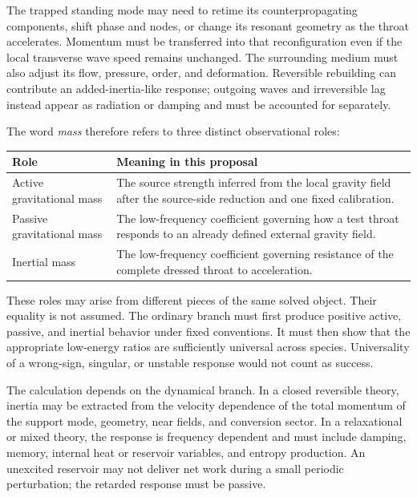 The trapped standing mode may need to retime its counterpropagating components,
shift phase and nodes, or change its resonant geometry as the throat accelerates.
Momentum must be transferred into that reconfiguration even if the local
transverse wave speed remains unchanged. The surrounding medium must also adjust
its flow, pressure, order, and deformation. Reversible rebuilding can contribute
an added-inertia-like response; outgoing waves and irreversible lag instead
appear as radiation or damping and must be accounted for separately.

The word \emph{mass} therefore refers to three distinct observational roles:

\begin{center}
\begin{tabularx}{\textwidth}{@{}L{0.24\textwidth}X@{}}
\toprule
\textbf{Role} & \textbf{Meaning in this proposal} \\
\midrule
Active gravitational mass & The source strength inferred from the local gravity field after the source-side reduction and one fixed calibration. \\
Passive gravitational mass & The low-frequency coefficient governing how a test throat responds to an already defined external gravity field. \\
Inertial mass & The low-frequency coefficient governing resistance of the complete dressed throat to acceleration. \\
\bottomrule
\end{tabularx}
\end{center}

These roles may arise from different pieces of the same solved object. Their
equality is not assumed. The ordinary branch must first produce positive active,
passive, and inertial behavior under fixed conventions. It must then show that
the appropriate low-energy ratios are sufficiently universal across species.
Universality of a wrong-sign, singular, or unstable response would not count as
success.

The calculation depends on the dynamical branch. In a closed reversible theory,
inertia may be extracted from the velocity dependence of the total momentum of
the support mode, geometry, near fields, and conversion sector. In a
relaxational or mixed theory, the response is frequency dependent and must
include damping, memory, internal heat or reservoir variables, and entropy
production. An unexcited reservoir may not deliver net work during a small
periodic perturbation; the retarded response must be passive.

